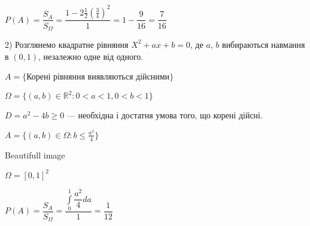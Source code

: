 $P(A) = \dfrac{S_A}{S_{\Omega}}
= \dfrac{1-2\frac{1}{2}(\frac{3}{4})^2}{1}
= 1 - \dfrac{9}{16}
= \dfrac{7}{16}$

2) Розглянемо квадратне рівняння $X^2 + ax + b = 0$, де $a$, $b$ вибираються
навмання в $(0, 1)$, незалежно одне від одного.

$A = \{$Корені рівняння виявляються дійсними$\}$

$\Omega = \{ (a, b) \in \mathbb{R}^2: 0 < a < 1, 0 < b < 1\}$

$D = a^2 - 4b \geqslant 0$ --- необхідна і достатня умова того, що корені дійсні.

$A = \{(a, b) \in \Omega: b \leqslant \frac{a^2}{4}\}$

\begin{center}
    Beautifull image
\end{center}

$\Omega = [0, 1]^2$

$P(A) = \dfrac{S_A}{S_{\Omega}}
= \dfrac{\int\limits_0^1 \dfrac{a^2}{4}da}{1}
= \dfrac{1}{12}$

